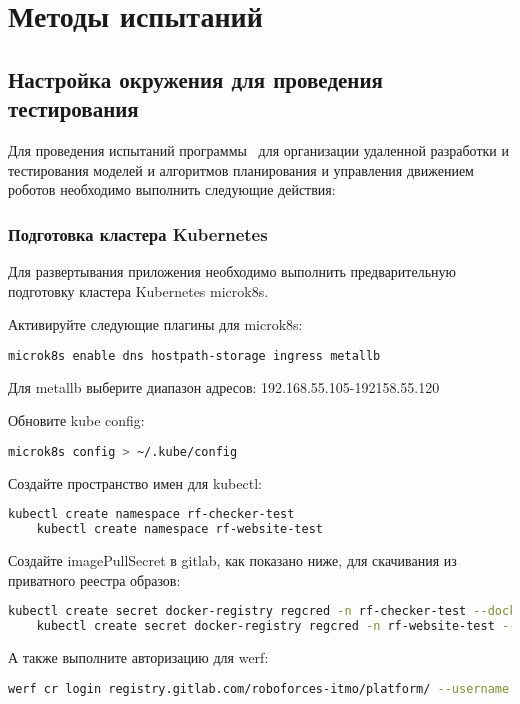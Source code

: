 \newpage
\section{Методы испытаний}

\subsection{Настройка окружения для проведения тестирования} \label{reqtest:setup}
Для проведения испытаний программы \productname\ для организации удаленной разработки и тестирования моделей и алгоритмов планирования и управления движением роботов необходимо выполнить следующие действия:


\subsubsection{Подготовка кластера Kubernetes}

Для развертывания приложения необходимо выполнить предварительную подготовку кластера Kubernetes microk8s.

Активируйте следующие плагины для microk8s:
\begin{lstlisting}[language=bash, numbers=none, frame=single]
    microk8s enable dns hostpath-storage ingress metallb
\end{lstlisting}
Для metallb выберите диапазон адресов: 192.168.55.105-192158.55.120

Обновите kube config:
\begin{lstlisting}[language=bash, numbers=none, frame=single]
    microk8s config > ~/.kube/config
\end{lstlisting}

Создайте пространство имен для kubectl:
\begin{lstlisting}[language=bash, numbers=none, frame=single]
    kubectl create namespace rf-checker-test
    kubectl create namespace rf-website-test
\end{lstlisting}

Создайте imagePullSecret в gitlab, как показано ниже, для скачивания из приватного реестра образов:
\begin{lstlisting}[language=bash, numbers=none, frame=single]
    kubectl create secret docker-registry regcred -n rf-checker-test --docker-server=https://registry.gitlab.com --docker-username=<TOKEN NAME| USERNAME> --docker-password=<TOKEN> 
    kubectl create secret docker-registry regcred -n rf-website-test --docker-server=https://registry.gitlab.com --docker-username=<TOKEN NAME| USERNAME> --docker-password=<TOKEN> 
\end{lstlisting}
А также выполните авторизацию для werf:
\begin{lstlisting}[language=bash, numbers=none, frame=single]
    werf cr login registry.gitlab.com/roboforces-itmo/platform/ --username <TOKEN_NAME | USERNAME> --password <TOKEN>
\end{lstlisting}

